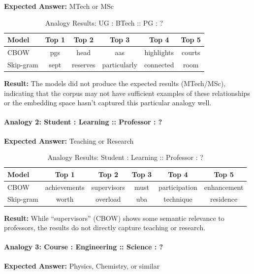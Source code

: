 \documentclass[12pt,a4paper]{article}
\begin{document}
\textbf{Expected Answer:} MTech or MSc

\begin{table}[H]
\centering
\caption{Analogy Results: UG : BTech :: PG : ?}
\begin{tabular}{@{}lccccc@{}}
\toprule
\textbf{Model} & \textbf{Top 1} & \textbf{Top 2} & \textbf{Top 3} & \textbf{Top 4} & \textbf{Top 5} \\
\midrule
CBOW & pgs & head & aas & highlights & courts \\
Skip-gram & sept & reserves & particularly & connected & room \\
\bottomrule
\end{tabular}
\end{table}

\textbf{Result:} The models did not produce the expected results (MTech/MSc), indicating that the corpus may not have sufficient examples of these relationships or the embedding space hasn't captured this particular analogy well.

\paragraph{Analogy 2: Student : Learning :: Professor : ?}

\textbf{Expected Answer:} Teaching or Research

\begin{table}[H]
\centering
\caption{Analogy Results: Student : Learning :: Professor : ?}
\begin{tabular}{@{}lccccc@{}}
\toprule
\textbf{Model} & \textbf{Top 1} & \textbf{Top 2} & \textbf{Top 3} & \textbf{Top 4} & \textbf{Top 5} \\
\midrule
CBOW & achievements & supervisors & must & participation & enhancement \\
Skip-gram & worth & overload & uba & technique & residence \\
\bottomrule
\end{tabular}
\end{table}

\textbf{Result:} While ``supervisors'' (CBOW) shows some semantic relevance to professors, the results do not directly capture teaching or research.

\paragraph{Analogy 3: Course : Engineering :: Science : ?}

\textbf{Expected Answer:} Physics, Chemistry, or similar
\end{document}
